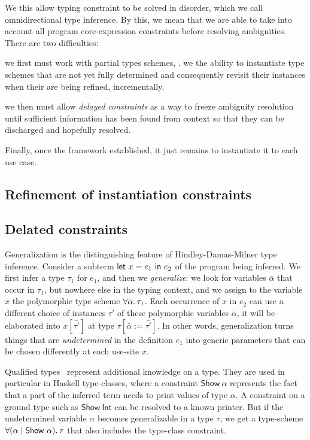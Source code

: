\documentclass[acmsmall,screen,nonacm]{acmart}
\begin{document}
We this allow typing constraint to be solved in disorder, which we call
omnidirectional type inference. By this, we mean that we are able to take
into account all program core-expression constraints before resolving
ambiguities.  There are two difficulties:
\begin{enumerate*}
\item
  we first must work with partial types schemes, \ie. we the ability
  to instantiate type schemes that are not yet fully determined and
  consequently revisit their instances when their are being refined,
  incrementally.
\item
  we then must allow \emph{delayed constraints} as a way to freeze ambiguity
  resolution until sufficient information has been found from context so
  that they can be discharged and hopefully resolved.

\end{enumerate*}
Finally, once the framework established, it just remains to instantiate it
to each use case.


\subsection {Refinement of instantiation constraints}

\subsection {Delated constraints} 


Generalization is the distinguishing feature of Hindley-Damas-Milner type
inference. Consider a subterm $\mathsf{let} ~ x = e_1 ~ \mathsf{in} ~ e_2$ of the program being
inferred. We first infer a type $\tau_1$ for $e_1$, and then we
\emph{generalize}: we look for variables $\bar{\alpha}$ that occur in
$\tau_1$, but nowhere else in the typing context, and we assign to the
variable $x$ the polymorphic type scheme $\forall {\bar{\alpha}}.\,{\tau_1}$. Each
occurrence of $x$ in $e_2$ can use a different choice of instances
$\bar{\tau'}$ of these polymorphic variables $\bar{\alpha}$, it will be
elaborated into $x [\bar{\tau'}]$ at type $\tau[\bar{\alpha} :=
\bar{\tau'}]$. In other words, generalization turns things that are
\emph{undetermined} in the definition $e_1$ into generic parameters that can
be chosen differently at each use-site $x$.

Qualified types~\citep*{TODO} represent additional knowledge on a type. They
are used in particular in Haskell type-classes, where a constraint
$\mathsf{Show}~\alpha$ represents the fact that a part of the inferred term
needs to print values of type $\alpha$. A constraint on a ground type such
as $\mathsf{Show}~\mathsf{Int}$ can be resolved to a known printer. But if
the undetermined variable $\alpha$ becomes generalizable in a type $\tau$,
we get a type-scheme $\forall {(\alpha \mid \mathsf{Show}~\alpha)}.\,{\tau}$ that
also includes the type-class constraint.
\end{document}
